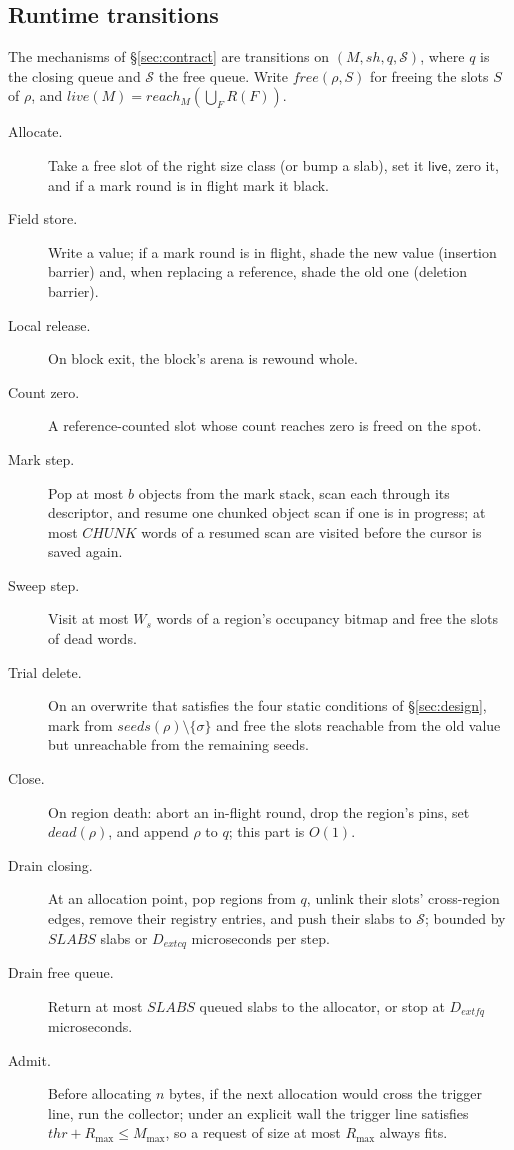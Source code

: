 \subsection{Runtime transitions}
\label{sec:transitions}

The mechanisms of \S\ref{sec:contract} are transitions on $(M, \mathit{sh}, q, \mathcal{S})$,
where $q$ is the closing queue and $\mathcal{S}$ the free queue.
Write $\mathit{free}(\rho, S)$ for freeing the slots $S$ of $\rho$, and
$\mathit{live}(M) = \mathit{reach}_M(\bigcup_F R(F))$.

\begin{description}
\item[Allocate.] Take a free slot of the right size class (or bump a slab), set it $\mathsf{live}$,
  zero it, and if a mark round is in flight mark it black.
\item[Field store.] Write a value; if a mark round is in flight, shade the new value (insertion
  barrier) and, when replacing a reference, shade the old one (deletion barrier).
\item[Local release.] On block exit, the block's arena is rewound whole.
\item[Count zero.] A reference-counted slot whose count reaches zero is freed on the spot.
\item[Mark step.] Pop at most $b$ objects from the mark stack, scan each through its descriptor, and
  resume one chunked object scan if one is in progress; at most $\mathit{CHUNK}$ words of a resumed
  scan are visited before the cursor is saved again.
\item[Sweep step.] Visit at most $W_s$ words of a region's occupancy bitmap and free the slots of
  dead words.
\item[Trial delete.] On an overwrite that satisfies the four static conditions of \S\ref{sec:design},
  mark from $\mathit{seeds}(\rho) \setminus \{\sigma\}$ and free the slots reachable from the old
  value but unreachable from the remaining seeds.
\item[Close.] On region death: abort an in-flight round, drop the region's pins, set
  $\mathit{dead}(\rho)$, and append $\rho$ to $q$; this part is $O(1)$.
\item[Drain closing.] At an allocation point, pop regions from $q$, unlink their slots'
  cross-region edges, remove their registry entries, and push their slabs to $\mathcal{S}$;
  bounded by $\mathit{SLABS}$ slabs or $\mathit{D}_{	ext{cq}}$ microseconds per step.
\item[Drain free queue.] Return at most $\mathit{SLABS}$ queued slabs to the allocator, or stop at
  $\mathit{D}_{	ext{fq}}$ microseconds.
\item[Admit.] Before allocating $n$ bytes, if the next allocation would cross the trigger line, run
  the collector; under an explicit wall the trigger line satisfies $\mathit{thr} + R_{\max} \le M_{\max}$,
  so a request of size at most $R_{\max}$ always fits.
\end{description}

